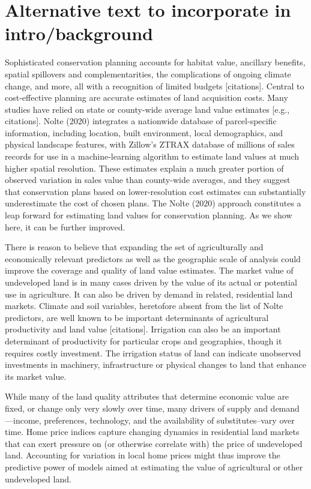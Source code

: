 \documentclass[12pt]{article}
\begin{document}
\section{Alternative text to incorporate in intro/background}
Sophisticated conservation planning accounts for habitat value, ancillary benefits, spatial spillovers and complementarities, the complications of ongoing climate change, and more, all with a recognition of limited budgets [citations]. Central to cost-effective planning are accurate estimates of land acquisition costs. Many studies have relied on state or county-wide average land value estimates [e.g., citations]. Nolte (2020) integrates a nationwide database of parcel-specific information, including location, built environment, local demographics, and physical landscape features, with Zillow’s ZTRAX database of millions of sales records for use in a machine-learning algorithm to estimate land values at much higher spatial resolution. These estimates explain a much greater portion of observed variation in sales value than county-wide averages, and they suggest that conservation plans based on lower-resolution cost estimates can substantially underestimate the cost of chosen plans. The Nolte (2020) approach constitutes a leap forward for estimating land values for conservation planning. As we show here, it can be further improved.

There is reason to believe that expanding the set of agriculturally and economically relevant predictors as well as the geographic scale of analysis could improve the coverage and quality of land value estimates. The market value of undeveloped land is in many cases driven by the value of its actual or potential use in agriculture. It can also be driven by demand in related, residential land markets. Climate and soil variables, heretofore absent from the list of Nolte predictors, are well known to be important determinants of agricultural productivity and land value [citations]. Irrigation can also be an important determinant of productivity for particular crops and geographies, though it requires costly investment. The irrigation status of land can indicate unobserved investments in machinery, infrastructure or physical changes to land that enhance its market value. 

While many of the land quality attributes that determine economic value are fixed, or change only very slowly over time, many drivers of supply and demand—income, preferences, technology, and the availability of substitutes--vary over time. Home price indices capture changing dynamics in residential land markets that can exert pressure on (or otherwise correlate with) the price of undeveloped land. Accounting for variation in local home prices might thus improve the predictive power of models aimed at estimating the value of agricultural or other undeveloped land. 
\end{document}

